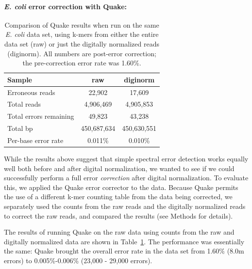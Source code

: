 \documentclass{article}
\begin{document}

\paragraph{{\em E. coli} error correction with Quake:}


\begin{table}
\begin{tabular}{|l|c|c|}
\hline
Sample              & raw    & diginorm \\
\hline
Erroneous reads        & 22,902      & 17,609 \\
Total reads            & 4,906,469   & 4,905,853 \\
Total errors remaining & 49,823      & 43,238 \\
Total bp               & 450,687,634 & 450,630,551 \\
Per-base error rate    & 0.011\%     & 0.010\% \\
\hline
\end{tabular}

\caption{Comparison of Quake results when run on the same {\em E. coli} data
set, using k-mers from either the entire data set (raw) or just the digitally
normalized reads (diginorm).  All numbers are post-error correction; the
pre-correction error rate was 1.60\%.}

\label{tab:quake_ecoli}
\end{table}

While the results above suggest that simple spectral error detection
works equally well both before and after digital normalization, we
wanted to see if we could successfully perform a full error {\em
  correction} after digital normalization.  To evaluate this, we
applied the Quake error corrector to the data.  Because Quake permits
the use of a different k-mer counting table from the data being
corrected, we separately used the counts from the raw reads and the
digitally normalized reads to correct the raw reads, and compared the
results (see Methods for details).

The results of running Quake on the raw data using counts from the raw
and digitally normalized data are shown in Table~\ref{tab:quake_ecoli}.
The performance was essentially the same: Quake brought the overall
error rate in the data set from 1.60\% (8.0m errors) to
0.005\%-0.006\% (23,000 - 29,000 errors).
\end{document}
